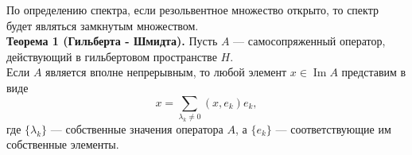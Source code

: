 \documentclass[12pt,a4paper, titlepage]{article}
\renewcommand{\Im}{\mathop{\mathrm{Im}}\nolimits}
\begin{document}
По определению спектра, если резольвентное множество открыто, то спектр будет являться замкнутым множеством.\\

\textbf{Теорема 1 (Гильберта - Шмидта).} Пусть $A$ --- самосопряженный оператор, действующий в гильбертовом пространстве $H$. \\

Если $A$ является вполне непрерывным, то любой элемент $x \in \Im A$ представим в виде
$$
x = \sum_{\lambda_k \neq 0} (x, e_k) e_k,
$$ 
где $\{\lambda_k\}$ --- собственные значения оператора $A$, а $\{e_k\}$ --- соответствующие им собственные элементы.
\end{document}
